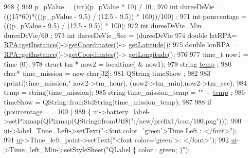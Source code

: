 \begin{DoxyCode}
968                                        \{
969     p\_pValue = (int)(p\_pValue * 10) / 10.;
970     \textcolor{keywordtype}{int} dureeDeVie = (((15*60)*(((p\_pValue - 9.5) / (12.5 - 9.5)) * 100))/100) ;
971     \textcolor{keywordtype}{int} pourcentage =(((p\_pValue - 9.5) / (12.5 - 9.5)) * 100);
972     \textcolor{keywordtype}{int} dureeDeVie\_Min = dureeDeVie/60 ;
973     \textcolor{keywordtype}{int} dureeDeVie\_Sec = (dureeDeVie%
974     \textcolor{keywordtype}{double} latRPA= \hyperlink{a00012_a40277d38c94caf6125045994ba06f18f}{RPA::getInstance}()->\hyperlink{a00012_a8aaef3ba118d70f729ec23dee71755a7}{getCoordinates}()->
      \hyperlink{a00006_a555fe9c52a678f22d66b31358566cfe9}{getLatitude}();
975     \textcolor{keywordtype}{double} lonRPA = \hyperlink{a00012_a40277d38c94caf6125045994ba06f18f}{RPA::getInstance}()->\hyperlink{a00012_a8aaef3ba118d70f729ec23dee71755a7}{getCoordinates}()->
      \hyperlink{a00006_aeca2669cb6715159606e844ab6a77bbf}{getLongitude}();
976 
977     time\_t now1 = time (0);
978     \textcolor{keyword}{struct }tm * now2 = localtime( & now1);
979     \textcolor{keywordtype}{string} \hyperlink{a00008_a57c52213e1c32a667a5963a122e0a23b}{temp} ;
980     \textcolor{keywordtype}{char}* time\_mission = \textcolor{keyword}{new} \textcolor{keywordtype}{char}[32];
981     QString timeShow ;
982 
983     sprintf(time\_mission,\textcolor{stringliteral}{"%
      now2->tm\_hour), (now2->tm\_min),now2->tm\_sec);
984     temp = string(time\_mission);
985     \textcolor{keywordtype}{string} time\_mission\_temp = \textcolor{stringliteral}{""} + \hyperlink{a00008_a57c52213e1c32a667a5963a122e0a23b}{temp} ;
986     timeShow = QString::fromStdString(time\_mission\_temp);
987 
988           \textcolor{keywordflow}{if} (pourcentage == 100 )
989          \{ \hyperlink{a00008_a6dc041ef6a2ffb329928d2913e8344e6}{ui}->battery\_label->setPixmap(QPixmap(QString::fromUtf8(\textcolor{stringliteral}{":/new/prefix1/icon/100.png"})));
990               \hyperlink{a00008_a6dc041ef6a2ffb329928d2913e8344e6}{ui}->label\_Time\_Left->setText(\textcolor{stringliteral}{"<font color='green'>Time Left : </font>"});
991               \hyperlink{a00008_a6dc041ef6a2ffb329928d2913e8344e6}{ui}->Time\_left\_point->setText(\textcolor{stringliteral}{"<font color='green'>: </font>"});
992               \hyperlink{a00008_a6dc041ef6a2ffb329928d2913e8344e6}{ui}->Time\_left\_Min->setStyleSheet(\textcolor{stringliteral}{"QLabel \{ color : green; \}"});
}
\end{DoxyCode}
